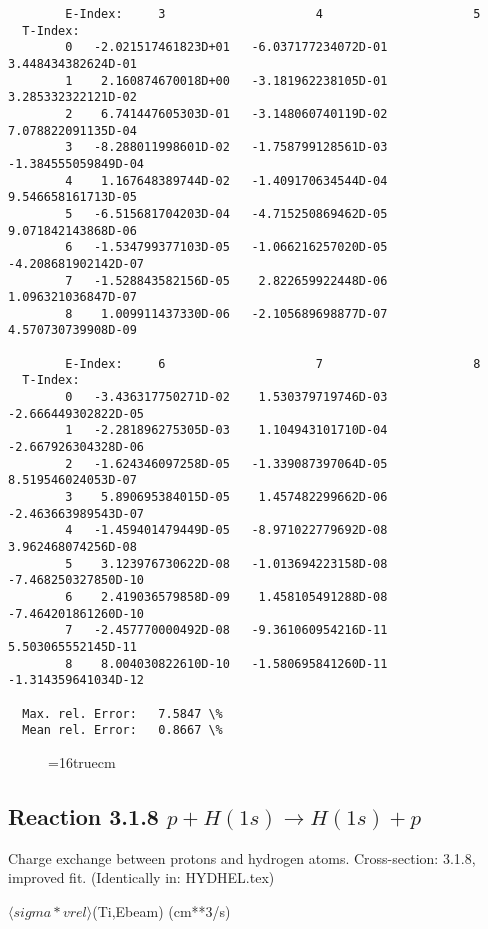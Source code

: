 \documentclass[12pt,dvipdfmx]{article}
\begin{document}
{\begin{small}
\begin{verbatim}
        E-Index:     3                     4                     5
  T-Index:
        0   -2.021517461823D+01   -6.037177234072D-01    3.448434382624D-01
        1    2.160874670018D+00   -3.181962238105D-01    3.285332322121D-02
        2    6.741447605303D-01   -3.148060740119D-02    7.078822091135D-04
        3   -8.288011998601D-02   -1.758799128561D-03   -1.384555059849D-04
        4    1.167648389744D-02   -1.409170634544D-04    9.546658161713D-05
        5   -6.515681704203D-04   -4.715250869462D-05    9.071842143868D-06
        6   -1.534799377103D-05   -1.066216257020D-05   -4.208681902142D-07
        7   -1.528843582156D-05    2.822659922448D-06    1.096321036847D-07
        8    1.009911437330D-06   -2.105689698877D-07    4.570730739908D-09

        E-Index:     6                     7                     8
  T-Index:
        0   -3.436317750271D-02    1.530379719746D-03   -2.666449302822D-05
        1   -2.281896275305D-03    1.104943101710D-04   -2.667926304328D-06
        2   -1.624346097258D-05   -1.339087397064D-05    8.519546024053D-07
        3    5.890695384015D-05    1.457482299662D-06   -2.463663989543D-07
        4   -1.459401479449D-05   -8.971022779692D-08    3.962468074256D-08
        5    3.123976730622D-08   -1.013694223158D-08   -7.468250327850D-10
        6    2.419036579858D-09    1.458105491288D-08   -7.464201861260D-10
        7   -2.457770000492D-08   -9.361060954216D-11    5.503065552145D-11
        8    8.004030822610D-10   -1.580695841260D-11   -1.314359641034D-12

  Max. rel. Error:   7.5847 \%
  Mean rel. Error:   0.8667 \%

\end{verbatim}\end{small}


\begin{figure} \label{2.3.9H3}
\epsfxsize=16truecm
\end{figure}
\newpage
\subsection{
Reaction 3.1.8  $ p + H(1s) \rightarrow H(1s) + p   $
}

 Charge exchange between protons and hydrogen
 atoms. Cross-section:  3.1.8, improved fit. (Identically in: HYDHEL.tex)

$  \langle sigma*vrel \rangle$(Ti,Ebeam)  (cm**3/s)

}
\end{document}
